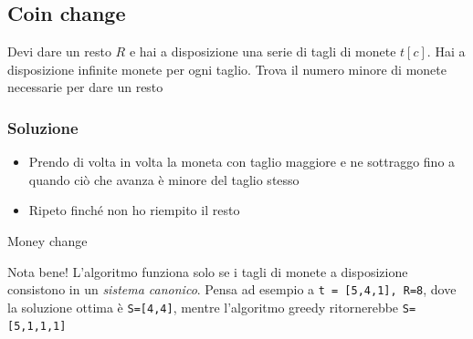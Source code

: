 \subsection{Coin change}
Devi dare un resto $ R $ e hai a disposizione una serie di tagli di monete $ t\left[c\right] $. Hai a disposizione infinite monete per ogni taglio. Trova il numero minore di monete necessarie per dare un resto
\vskip3mm
\subsubsection{Soluzione}
\vskip3mm
\begin{itemize}
	\item Prendo di volta in volta la moneta con taglio maggiore e ne sottraggo fino a quando ciò che  avanza è minore del taglio stesso
	\item Ripeto finché non ho riempito il resto
\end{itemize}

\begin{algoritmo}{Money change}
	\begin{algorithm}[H]
		\caption{Coin change greedy per sistemi canonici}
		\vskip3mm
		\vskip3mm

	\end{algorithm}\label{greedy coin change}
\end{algoritmo}
\vskip3mm


Nota bene! L'algoritmo funziona solo se i tagli di monete a disposizione consistono in un \textit{sistema canonico}. Pensa ad esempio a \verb|t = [5,4,1], R=8|, dove la soluzione ottima è \verb|S=[4,4]|, mentre l'algoritmo greedy ritornerebbe \verb|S=[5,1,1,1]|
\vskip3mm


